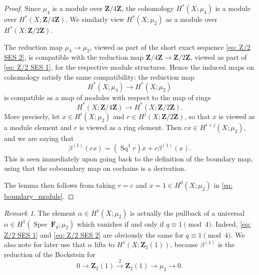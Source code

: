 \documentclass[10pt, reqno]{amsart}
\numberwithin{equation}{subsection}
\newcommand{\F}{\mathbf{F}}
\newcommand{\wt}[1]{\widetilde{#1}}
\newcommand{\Z}{\mathbf{Z}}
\DeclareMathOperator{\et}{\acute{e}t}
\DeclareMathOperator{\Spec}{Spec\,}
\DeclareMathOperator{\Sq}{Sq}
\theoremstyle{remark}
\newtheorem{remark}[thm]{Remark}
\begin{document}
\begin{proof}
Since $\mu_4$ is a module over $\Z/4 \Z$, the cohomology $H_{\et}^*(X; \mu_4)$ is a module over $H_{\et}^*(X; \Z/4\Z)$. We similarly view $H_{\et}^*(X; \mu_2) $ as a module over $H_{\et}^*(X; \Z/2\Z)$. 

The reduction map $\mu_4 \rightarrow \mu_2$,
viewed as part of the short exact sequence \eqref{eq: Z/2 SES 2}, is compatible with the reduction map $\Z/4 \Z \rightarrow \Z/2\Z$, viewed as part of \eqref{eq: Z/2 SES 1},
for the respective module structures. Hence the induced maps on cohomology satisfy the same compatibility: the reduction map  
\[
H^*_{\et}(X; \mu_4)  \rightarrow  H^*_{\et}(X;\mu_2)
\]
is compatible as a map of modules with respect to the map of rings 
\[
H^*_{\et}(X; \Z/4 \Z)  \rightarrow  H^*_{\et}(X;\Z/2\Z).
\]
More precisely, let $x \in H^i_{\et}(X; \mu_2)$ and $r \in H^j_{\et}(X; \Z/2\Z)$,
so that $x$ is viewed as a module element and $r$ is viewed as a ring element. Then $rx \in H^{i+j}_{\et}(X; \mu_2)$, and we are saying that
\begin{equation}\label{eq: boundary_module}
\beta^{(1)} (rx) = (\Sq^1 r)  x + r \beta^{(1)}(x).
\end{equation}
This is seen immediately upon going back to the definition of the boundary map, using that the coboundary map on cochains is a derivation. 

The lemma then follows from taking $r=c$ and $x=1 \in H^0(X; \mu_2)$ in \eqref{eq: boundary_module}.


\end{proof}

\begin{remark}\label{rem: alpha}
The element $\alpha \in H^1_{\et}(X; \mu_2)$ is actually the pullback of a universal $\alpha \in H^1_{\et}(\Spec \F_q; \mu_2)$ which vanishes if and only if $q \equiv 1 \pmod{4}$. Indeed, \eqref{eq: Z/2 SES 1} and  \eqref{eq: Z/2 SES 2} are obviously the same for $q \equiv 1 \pmod{4}$. We also note for later use that $\alpha$ lifts to $H^1_{\et}(X; \Z_2(1))$, because $\beta^{(1)}$ is the reduction of the Bockstein for 
\[
0 \rightarrow \Z_2(1) \xrightarrow{2} \Z_2(1) \rightarrow \mu_2  \rightarrow 0.
\]
\end{remark}
\end{document}
